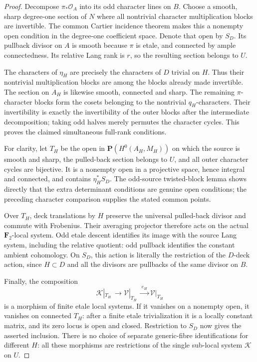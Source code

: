 \begin{proof}
Decompose \(\pi_*\mathcal O_A\) into its odd character lines
on \(B\). Choose a smooth, sharp degree-one section of \(N\)
where all nontrivial character multiplication blocks are invertible.
The common Cartier incidence theorem makes this a nonempty open
condition in the degree-one coefficient space. Denote that open by
\(S_D\). Its pullback divisor on \(A\) is smooth because
\(\pi\) is etale, and connected by ample connectedness.
Its relative Lang rank is \(r\), so the resulting section belongs
to \(U\).

The characters of \(\eta_H\) are precisely the characters of
\(D\) trivial on \(H\). Thus their nontrivial multiplication
blocks are among the blocks already made invertible. The section on
\(A_H\) is likewise smooth, connected and sharp. The remaining
\(\pi\)-character blocks form the cosets belonging to the
nontrivial \(q_H\)-characters. Their invertibility is exactly
the invertibility of the outer blocks after the intermediate
decomposition; taking odd halves merely permutes the character
cycles. This proves the claimed simultaneous full-rank conditions.

For clarity, let \(T_H\) be the open in
\(\mathbf P(H^0(A_H,M_H))\) on which the source is smooth and
sharp, the pulled-back section belongs to \(U\), and all outer
character cycles are bijective. It is a nonempty open in a
projective space, hence integral and connected, and contains
\(\eta_H^*S_D\). The odd-source twisted-block lemma shows
directly that the extra determinant conditions are genuine open
conditions; the preceding character comparison supplies the stated
common points.

Over \(T_H\), deck translations by \(H\) preserve the
universal pulled-back divisor and commute with Frobenius. Their
averaging projector therefore acts on the actual
\(\mathbf F_2\)-local system. Odd etale descent identifies its
image with the source Lang system, including the relative quotient:
odd pullback identifies the constant ambient cohomology. On
\(S_D\), this action is literally the restriction of the
\(D\)-deck action, since \(H\subset D\) and all the divisors
are pullbacks of the same divisor on \(B\).

Finally, the composition
\[
 \mathcal K|_{T_H}\ \longrightarrow
 \mathcal V|_{T_H}\ \xrightarrow{\ e_H\ }
 \mathcal V|_{T_H}
 \tag{CCI5}
\]
is a morphism of finite etale local systems. If it vanishes on a
nonempty open, it vanishes on connected \(T_H\): after a finite
etale trivialization it is a locally constant matrix, and its
zero locus is open and closed. Restriction to \(S_D\) now gives
the asserted inclusion. There is no choice of separate generic-fibre
identifications for different \(H\): all these morphisms are
restrictions of the single sub-local system \(\mathcal K\)
on \(U\).
\end{proof}

